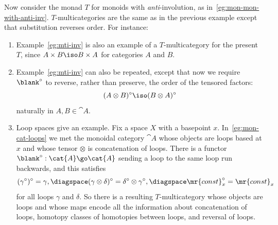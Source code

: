 \begin{example}	%
%
%
Now consider the monad $T$ for monoids with \emph{anti}-involution, as
in~\ref{eg:mon-mon-with-anti-inv}.  $T$-multicategories are the
same as in the previous example except that substitution reverses order.
For instance:
%
\begin{enumerate}
\item Example~\ref{eg:mti-inv} is also an example of a
$T$-multicategory for the present $T$, since $A \times B \iso B \times A$
for categories $A$ and $B$.
\item Example~\ref{eg:mti-inv} can also be repeated,
except that now we require $\blank^\circ$ to reverse, rather than preserve,
the order of the tensored factors:
\[
(A \otimes B)^\circ \iso (B\otimes A)^\circ
\]
naturally in $A, B \in \cat{A}$.  
\item Loop%
%
%
spaces give an example.  Fix a space $X$ with a basepoint $x$.
In~\ref{eg:mon-cat-loops} we met the monoidal category $\cat{A}$ whose
objects are loops based at $x$ and whose tensor $\otimes$ is concatenation
of loops.  There is a functor $\blank^\circ: \cat{A} \go \cat{A}$ sending a
loop to the same loop run backwards, and this satisfies
\[
(\gamma^\circ)^\circ = \gamma,
\diagspace
(\gamma \otimes \delta)^\circ = \delta^\circ \otimes \gamma^\circ,
\diagspace
\mr{const}_x^\circ = \mr{const}_x
\]
for all loops $\gamma$ and $\delta$.  So there is a resulting
$T$-multicategory whose objects are loops and whose maps encode all the
information about concatenation of loops, homotopy classes of homotopies
between loops, and reversal%
%
%
of loops.
\end{enumerate}
%
\end{example}

